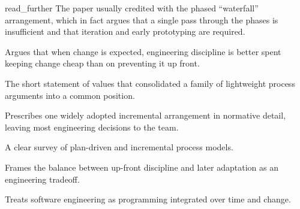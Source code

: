 \begin{bookbox}{read_further}{} %
\citep{royce1970} The paper usually credited with the phased ``waterfall'' arrangement, which in fact argues that a single pass through the phases is insufficient and that iteration and early prototyping are required.

\citep{beck1999xp} Argues that when change is expected, engineering discipline is better spent keeping change cheap than on preventing it up front.

\citep{agile-manifesto2001} The short statement of values that consolidated a family of lightweight process arguments into a common position.

\citep{scrumguide2020} Prescribes one widely adopted incremental arrangement in normative detail, leaving most engineering decisions to the team.

\citep{sommerville2016} A clear survey of plan-driven and incremental process models.

\citep{boehm2003balancing} Frames the balance between up-front discipline and later adaptation as an engineering tradeoff.

\citep{winters2020} Treats software engineering as programming integrated over time and change.
\end{bookbox}
